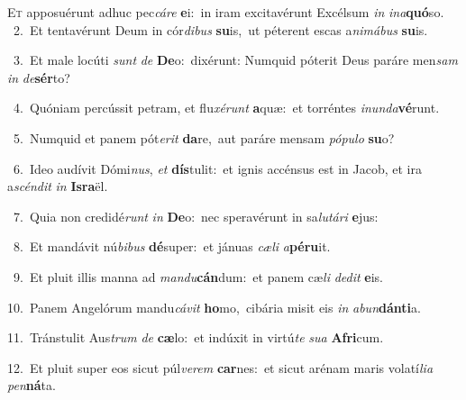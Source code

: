 \lettrine{\initial\textcolor{\initialcolor}{E}}{t} apposuérunt adhuc pec\-\textit{cá}\-\textit{re} \textbf{e}\-i:~\star in iram excitavérunt Excélsum \textit{in} \textit{in}\-\textit{a}\textbf{quó}so.\\
{\numbfont\textcolor{\numbcolor}{~2.}}~Et tentavérunt Deum in cór\-\textit{di}\-\textit{bus} \textbf{su}\-is,~\star ut péterent escas a\-\textit{ni}\-\textit{má}\textit{bus} \textbf{su}\-is.\par
{\numbfont\textcolor{\numbcolor}{~3.}}~Et male locúti \textit{sunt} \textit{de} \textbf{De}\-o:~\star dixérunt: Numquid póterit Deus paráre men\textit{sam} \textit{in} \textit{de}\-\textbf{sér}to?\par
{\numbfont\textcolor{\numbcolor}{~4.}}~Quóniam percússit petram, et flu\-\textit{xé}\-\textit{runt} \textbf{a}\-quæ:~\star et torréntes \textit{in}\-\textit{un}\textit{da}\textbf{vé}runt.\par
{\numbfont\textcolor{\numbcolor}{~5.}}~Numquid et panem pót\-\textit{e}\-\textit{rit} \textbf{da}\-re,~\star aut paráre mensam \textit{pó}\-\textit{pu}\textit{lo} \textbf{su}\-o?\par
{\numbfont\textcolor{\numbcolor}{~6.}}~Ideo audívit Dómi\-\textit{nus}\-, \textit{et} \textbf{dís}\-tulit:~\star et ignis accénsus est in Jacob, et ira a\-\textit{scén}\-\textit{dit} \textit{in} \textbf{Is}\-\textbf{ra}ël.\par
{\numbfont\textcolor{\numbcolor}{~7.}}~Quia non credidé\textit{runt} \textit{in} \textbf{De}\-o:~\star nec speravérunt in sa\-\textit{lu}\-\textit{tá}\textit{ri} \textbf{e}\-jus:\par
{\numbfont\textcolor{\numbcolor}{~8.}}~Et mandávit nú\-\textit{bi}\-\textit{bus} \textbf{dé}\-super:~\star et jánuas \textit{cæ}\-\textit{li} \textit{a}\-\textbf{pé}\textbf{ru}it.\par
{\numbfont\textcolor{\numbcolor}{~9.}}~Et pluit illis manna ad \textit{man}\-\textit{du}\textbf{cán}dum:~\star et panem cæ\textit{li} \textit{de}\-\textit{dit} \textbf{e}\-is.\par
{\numbfont\textcolor{\numbcolor}{10.}}~Panem Angelórum mandu\-\textit{cá}\-\textit{vit} \textbf{ho}\-mo,~\star cibária misit eis \textit{in} \textit{ab}\-\textit{un}\textbf{dán}\textbf{ti}a.\par
{\numbfont\textcolor{\numbcolor}{11.}}~Tránstulit Aus\textit{trum} \textit{de} \textbf{cæ}\-lo:~\star et indúxit in virtú\textit{te} \textit{su}\-\textit{a} \textbf{A}\-\textbf{fri}cum.\par
{\numbfont\textcolor{\numbcolor}{12.}}~Et pluit super eos sicut púl\-\textit{ve}\-\textit{rem} \textbf{car}\-nes:~\star et sicut arénam maris volatí\-\textit{li}\-\textit{a} \textit{pen}\-\textbf{ná}ta.\par
